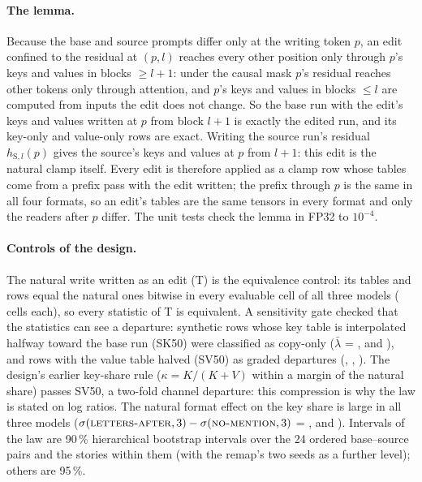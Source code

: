 \paragraph{The lemma.} Because the base and source prompts differ only at the writing token $p$, an edit confined to the residual at $(p, l)$ reaches every other position only through $p$'s keys and values in blocks $\geq l{+}1$: under the causal mask $p$'s residual reaches other tokens only through attention, and $p$'s keys and values in blocks $\leq l$ are computed from inputs the edit does not change. So the base run with the edit's keys and values written at $p$ from block $l{+}1$ is exactly the edited run, and its key-only and value-only rows are exact. Writing the source run's residual $h_{\mathrm{S},l}(p)$ gives the source's keys and values at $p$ from $l{+}1$: this edit is the natural clamp itself. Every edit is therefore applied as a clamp row whose tables come from a prefix pass with the edit written; the prefix through $p$ is the same in all four formats, so an edit's tables are the same tensors in every format and only the readers after $p$ differ. The unit tests check the lemma in FP32 to $10^{-4}$.

\paragraph{Controls of the design.} The natural write written as an edit (T) is the equivalence control: its tables and rows equal the natural ones bitwise in every evaluable cell of all three models (\JcGoneCellsQwenSeven{} cells each), so every statistic of T is equivalent. A sensitivity gate checked that the statistics can see a departure: synthetic rows whose key table is interpolated halfway toward the base run (SK50) were classified as copy-only ($\bar\lambda$ = \JcGeightSkFiftyQwenSeven{}, \JcGeightSkFiftyMistralSeven{} and \JcGeightSkFiftyLlamaEight{}), and rows with the value table halved (SV50) as graded departures (\JcGeightSvFiftyQwenSeven{}, \JcGeightSvFiftyMistralSeven{}, \JcGeightSvFiftyLlamaEight{}). The design's earlier key-share rule ($\kappa = K/(K+V)$ within a margin of the natural share) passes SV50, a two-fold channel departure: this compression is why the law is stated on log ratios. The natural format effect on the key share is large in all three models ($\sigma(\text{\textsc{letters-after}{}}, 3) - \sigma(\text{\textsc{no-mention}{}}, 3)$ = \JcGtwoQwenSeven{}, \JcGtwoMistralSeven{} and \JcGtwoLlamaEight{}). Intervals of the law are 90\,\% hierarchical bootstrap intervals over the 24 ordered base--source pairs and the stories within them (with the remap's two seeds as a further level); others are 95\,\%. %


